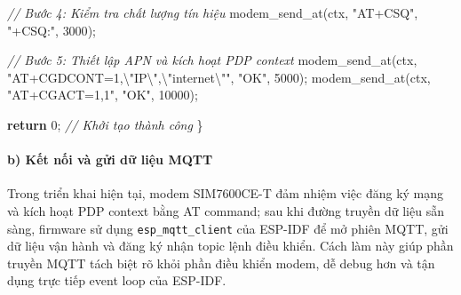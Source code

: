 \documentclass[a4paper]{extarticle}
\newenvironment{Shaded}{}{}
\newcommand{\CommentTok}[1]{\textcolor[rgb]{0.38,0.63,0.69}{\textit{#1}}}
\newcommand{\ControlFlowTok}[1]{\textcolor[rgb]{0.00,0.44,0.13}{\textbf{#1}}}
\newcommand{\DecValTok}[1]{\textcolor[rgb]{0.25,0.63,0.44}{#1}}
\newcommand{\NormalTok}[1]{#1}
\newcommand{\OperatorTok}[1]{\textcolor[rgb]{0.40,0.40,0.40}{#1}}
\newcommand{\SpecialCharTok}[1]{\textcolor[rgb]{0.25,0.44,0.63}{#1}}
\newcommand{\StringTok}[1]{\textcolor[rgb]{0.25,0.44,0.63}{#1}}
\begin{document}
\begin{Shaded}
\begin{Highlighting}[]
    \CommentTok{// Bước 4: Kiểm tra chất lượng tín hiệu}
\NormalTok{    modem\_send\_at}\OperatorTok{(}\NormalTok{ctx}\OperatorTok{,} \StringTok{"AT+CSQ"}\OperatorTok{,} \StringTok{"+CSQ:"}\OperatorTok{,} \DecValTok{3000}\OperatorTok{);}

    \CommentTok{// Bước 5: Thiết lập APN và kích hoạt PDP context}
\NormalTok{    modem\_send\_at}\OperatorTok{(}\NormalTok{ctx}\OperatorTok{,} \StringTok{"AT+CGDCONT=1,}\SpecialCharTok{\textbackslash{}"}\StringTok{IP}\SpecialCharTok{\textbackslash{}"}\StringTok{,}\SpecialCharTok{\textbackslash{}"}\StringTok{internet}\SpecialCharTok{\textbackslash{}"}\StringTok{"}\OperatorTok{,} \StringTok{"OK"}\OperatorTok{,} \DecValTok{5000}\OperatorTok{);}
\NormalTok{    modem\_send\_at}\OperatorTok{(}\NormalTok{ctx}\OperatorTok{,} \StringTok{"AT+CGACT=1,1"}\OperatorTok{,} \StringTok{"OK"}\OperatorTok{,} \DecValTok{10000}\OperatorTok{);}

    \ControlFlowTok{return} \DecValTok{0}\OperatorTok{;}  \CommentTok{// Khởi tạo thành công}
\OperatorTok{\}}
\end{Highlighting}
\end{Shaded}

\paragraph{b) Kết nối và gửi dữ liệu
MQTT}\label{b-kux1ebft-nux1ed1i-vuxe0-gux1eedi-dux1eef-liux1ec7u-mqtt}

Trong triển khai hiện tại, modem SIM7600CE-T đảm nhiệm việc đăng ký mạng
và kích hoạt PDP context bằng AT command; sau khi đường truyền dữ liệu
sẵn sàng, firmware sử dụng \texttt{esp\_mqtt\_client} của ESP-IDF để mở
phiên MQTT, gửi dữ liệu vận hành và đăng ký nhận topic lệnh điều khiển. Cách
làm này giúp phần truyền MQTT tách biệt rõ khỏi phần điều khiển modem,
dễ debug hơn và tận dụng trực tiếp event loop của ESP-IDF.
\end{document}
